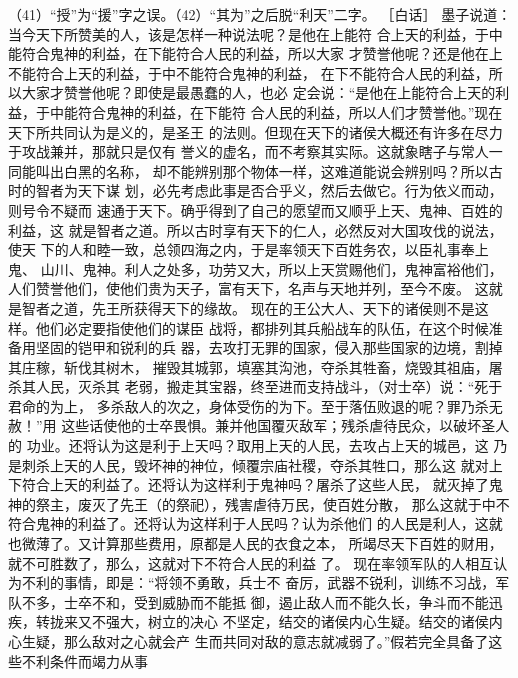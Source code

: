 \documentclass[12pt,UTF8]{ctexbook}
\begin{document}
（41）“授”为“援”字之误。（42）“其为”之后脱“利天”二字。 
［白话］ 
墨子说道：当今天下所赞美的人，该是怎样一种说法呢？是他在上能符 
合上天的利益，于中能符合鬼神的利益，在下能符合人民的利益，所以大家 
才赞誉他呢？还是他在上不能符合上天的利益，于中不能符合鬼神的利益， 
在下不能符合人民的利益，所以大家才赞誉他呢？即使是最愚蠢的人，也必 
定会说：“是他在上能符合上天的利益，于中能符合鬼神的利益，在下能符 
合人民的利益，所以人们才赞誉他。”现在天下所共同认为是义的，是圣王 
的法则。但现在天下的诸侯大概还有许多在尽力于攻战兼并，那就只是仅有 
誉义的虚名，而不考察其实际。这就象瞎子与常人一同能叫出白黑的名称， 
却不能辨别那个物体一样，这难道能说会辨别吗？所以古时的智者为天下谋 
划，必先考虑此事是否合乎义，然后去做它。行为依义而动，则号令不疑而 
速通于天下。确乎得到了自己的愿望而又顺乎上天、鬼神、百姓的利益，这 
就是智者之道。所以古时享有天下的仁人，必然反对大国攻伐的说法，使天 
下的人和睦一致，总领四海之内，于是率领天下百姓务农，以臣礼事奉上鬼、 
山川、鬼神。利人之处多，功劳又大，所以上天赏赐他们，鬼神富裕他们， 
人们赞誉他们，使他们贵为天子，富有天下，名声与天地并列，至今不废。 
这就是智者之道，先王所获得天下的缘故。 
现在的王公大人、天下的诸侯则不是这样。他们必定要指使他们的谋臣 
战将，都排列其兵船战车的队伍，在这个时候准备用坚固的铠甲和锐利的兵 
器，去攻打无罪的国家，侵入那些国家的边境，割掉其庄稼，斩伐其树木， 
摧毁其城郭，填塞其沟池，夺杀其牲畜，烧毁其祖庙，屠杀其人民，灭杀其 
老弱，搬走其宝器，终至进而支持战斗，（对士卒）说：“死于君命的为上， 
多杀敌人的次之，身体受伤的为下。至于落伍败退的呢？罪乃杀无赦！”用 
这些话使他的士卒畏惧。兼并他国覆灭敌军；残杀虐待民众，以破坏圣人的 
功业。还将认为这是利于上天吗？取用上天的人民，去攻占上天的城邑，这 
乃是刺杀上天的人民，毁坏神的神位，倾覆宗庙社稷，夺杀其牲口，那么这 
就对上下符合上天的利益了。还将认为这样利于鬼神吗？屠杀了这些人民， 
就灭掉了鬼神的祭主，废灭了先王（的祭祀），残害虐待万民，使百姓分散， 
那么这就于中不符合鬼神的利益了。还将认为这样利于人民吗？认为杀他们 
的人民是利人，这就也微薄了。又计算那些费用，原都是人民的衣食之本， 
所竭尽天下百姓的财用，就不可胜数了，那么，这就对下不符合人民的利益 
了。 
现在率领军队的人相互认为不利的事情，即是：“将领不勇敢，兵士不 
奋厉，武器不锐利，训练不习战，军队不多，士卒不和，受到威胁而不能抵 
御，遏止敌人而不能久长，争斗而不能迅疾，转拢来又不强大，树立的决心 
不坚定，结交的诸侯内心生疑。结交的诸侯内心生疑，那么敌对之心就会产 
生而共同对敌的意志就减弱了。”假若完全具备了这些不利条件而竭力从事 
\end{document}
